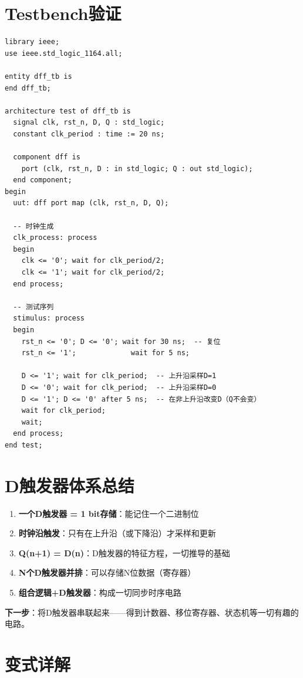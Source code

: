 \section{Testbench验证}

\begin{lstlisting}[caption={D触发器Testbench}]
library ieee;
use ieee.std_logic_1164.all;

entity dff_tb is
end dff_tb;

architecture test of dff_tb is
  signal clk, rst_n, D, Q : std_logic;
  constant clk_period : time := 20 ns;

  component dff is
    port (clk, rst_n, D : in std_logic; Q : out std_logic);
  end component;
begin
  uut: dff port map (clk, rst_n, D, Q);

  -- 时钟生成
  clk_process: process
  begin
    clk <= '0'; wait for clk_period/2;
    clk <= '1'; wait for clk_period/2;
  end process;

  -- 测试序列
  stimulus: process
  begin
    rst_n <= '0'; D <= '0'; wait for 30 ns;  -- 复位
    rst_n <= '1';             wait for 5 ns;

    D <= '1'; wait for clk_period;  -- 上升沿采样D=1
    D <= '0'; wait for clk_period;  -- 上升沿采样D=0
    D <= '1'; D <= '0' after 5 ns;  -- 在非上升沿改变D（Q不会变）
    wait for clk_period;
    wait;
  end process;
end test;
\end{lstlisting}

\section{D触发器体系总结}

\begin{enumerate}
  \item \textbf{一个D触发器 = 1 bit存储}：能记住一个二进制位
  \item \textbf{时钟沿触发}：只有在上升沿（或下降沿）才采样和更新
  \item \textbf{Q(n+1) = D(n)}：D触发器的特征方程，一切推导的基础
  \item \textbf{N个D触发器并排}：可以存储N位数据（寄存器）
  \item \textbf{组合逻辑+D触发器}：构成一切同步时序电路
\end{enumerate}

\textbf{下一步}：将D触发器串联起来——得到计数器、移位寄存器、状态机等一切有趣的电路。

\section{变式详解}
